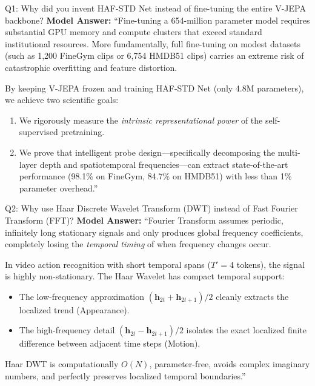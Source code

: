 \documentclass[a4paper, 11pt]{article}
\begin{document}
\begin{defensebox}{Q1: Why did you invent HAF-STD Net instead of fine-tuning the entire V-JEPA backbone?}
\textbf{Model Answer:}
``Fine-tuning a 654-million parameter model requires substantial GPU memory and compute clusters that exceed standard institutional resources. More fundamentally, full fine-tuning on modest datasets (such as 1,200 FineGym clips or 6,754 HMDB51 clips) carries an extreme risk of catastrophic overfitting and feature distortion.

By keeping V-JEPA frozen and training HAF-STD Net (only 4.8M parameters), we achieve two scientific goals:
\begin{enumerate}
    \item We rigorously measure the \emph{intrinsic representational power} of the self-supervised pretraining.
    \item We prove that intelligent probe design—specifically decomposing the multi-layer depth and spatiotemporal frequencies—can extract state-of-the-art performance (98.1\% on FineGym, 84.7\% on HMDB51) with less than 1\% parameter overhead.''
\end{enumerate}
\end{defensebox}

\vspace{0.2cm}

\begin{defensebox}{Q2: Why use Haar Discrete Wavelet Transform (DWT) instead of Fast Fourier Transform (FFT)?}
\textbf{Model Answer:}
``Fourier Transform assumes periodic, infinitely long stationary signals and only produces global frequency coefficients, completely losing the \emph{temporal timing} of when frequency changes occur.

In video action recognition with short temporal spans ($T'=4$ tokens), the signal is highly non-stationary. The Haar Wavelet has compact temporal support:
\begin{itemize}
    \item The low-frequency approximation $(\mathbf{h}_{2t} + \mathbf{h}_{2t+1})/2$ cleanly extracts the localized trend (Appearance).
    \item The high-frequency detail $(\mathbf{h}_{2t} - \mathbf{h}_{2t+1})/2$ isolates the exact localized finite difference between adjacent time steps (Motion).
\end{itemize}
Haar DWT is computationally $O(N)$, parameter-free, avoids complex imaginary numbers, and perfectly preserves localized temporal boundaries.''
\end{defensebox}
\end{document}

